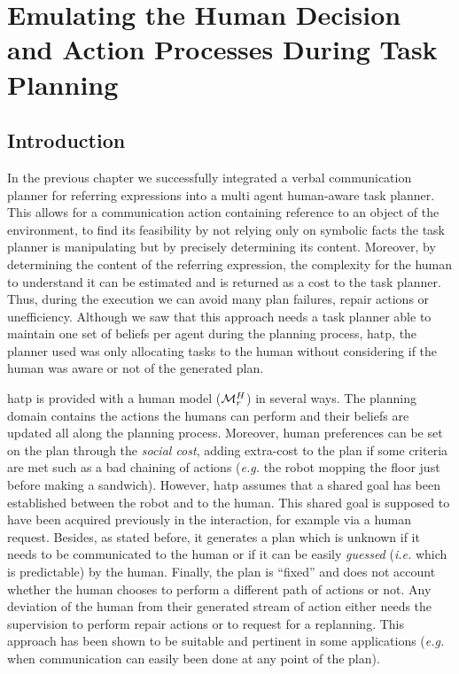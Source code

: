 \documentclass[a4paper,11pt,twoside]{StyleThese}
\begin{document}
\setcounter{chapter}{3} %
\dominitoc
\faketableofcontents
\fi

\chapter{Emulating the Human Decision and Action Processes During Task Planning}
\label{chapter:doublehtn}
\minitoc

\section{Introduction}
In the previous chapter we successfully integrated a verbal communication planner for referring expressions into a multi agent human-aware task planner. This allows for a communication action containing reference to an object of the environment, to find its feasibility by not relying only on symbolic facts the task planner is manipulating but by precisely determining its content. Moreover, by determining the content of the referring expression, the complexity for the human to understand it can be estimated and is returned as a cost to the task planner. Thus, during the execution we can avoid many plan failures, repair actions or unefficiency. Although we saw that this approach needs a task planner able to maintain one set of beliefs per agent during the planning process, \acrshort{hatp}, the planner used was only allocating tasks to the human without considering if the human was aware or not of the generated plan.

\acrshort{hatp} is provided with a human model ($\mathcal{M}^H_r$) in several ways. The planning domain contains the actions the humans can perform and their beliefs are updated all along the planning process. Moreover, human preferences can be set on the plan through the \textit{social cost}, adding extra-cost to the plan if some criteria are met such as a bad chaining of actions (\textit{e.g.} the robot mopping the floor just before making a sandwich). However, \acrshort{hatp} assumes that a shared goal has been established between the robot and to the human. This shared goal is supposed to have been acquired previously in the interaction, for example via a human request. Besides, as stated before, it generates a plan which is unknown if it needs to be communicated to the human or if it can be easily \textit{guessed} (\textit{i.e.} which is predictable) by the human. Finally, the plan is ``fixed'' and does not account whether the human chooses to perform a different path of actions or not. Any deviation of the human from their generated stream of action either needs the supervision to perform repair actions or to request for a replanning. This approach has been shown to be suitable and pertinent in some applications (\textit{e.g.} when communication can easily been done at any point of the plan).
\end{document}
